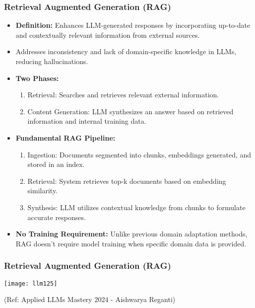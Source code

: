 \begin{frame}[fragile]\frametitle{Retrieval Augmented Generation (RAG)}
  \begin{itemize}
    \item \textbf{Definition:} Enhances LLM-generated responses by incorporating up-to-date and contextually relevant information from external sources.
    \item Addresses inconsistency and lack of domain-specific knowledge in LLMs, reducing hallucinations.
    \item \textbf{Two Phases:}
      \begin{enumerate}
        \item Retrieval: Searches and retrieves relevant external information.
        \item Content Generation: LLM synthesizes an answer based on retrieved information and internal training data.
      \end{enumerate}
    \item \textbf{Fundamental RAG Pipeline:}
      \begin{enumerate}
        \item Ingestion: Documents segmented into chunks, embeddings generated, and stored in an index.
        \item Retrieval: System retrieves top-k documents based on embedding similarity.
        \item Synthesis: LLM utilizes contextual knowledge from chunks to formulate accurate responses.
      \end{enumerate}
    \item \textbf{No Training Requirement:} Unlike previous domain adaptation methods, RAG doesn't require model training when specific domain data is provided.
  \end{itemize}
\end{frame}

\begin{frame}[fragile]\frametitle{Retrieval Augmented Generation (RAG)}

\begin{center}
\texttt{[image: llm125]}
\end{center}				

{\tiny (Ref: Applied LLMs Mastery 2024 - Aishwarya Reganti)}

\end{frame}

